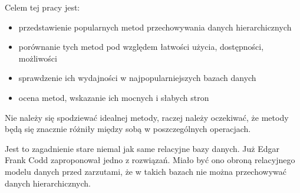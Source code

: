 






Celem tej pracy jest:
\begin{itemize}
    \item przedstawienie popularnych metod przechowywania danych hierarchicznych
    \item porównanie tych metod pod względem łatwości użycia, dostępności, możliwości
    \item sprawdzenie ich wydajności w najpopularniejszych bazach danych
    \item ocena metod, wskazanie ich mocnych i słabych stron
\end{itemize}

Nie należy się spodziewać idealnej metody, raczej należy oczekiwać, że metody będą się znacznie różniły między sobą w poszczególnych operacjach.


Jest to zagadnienie stare niemal jak same relacyjne bazy danych. 
Już Edgar Frank Codd zaproponował jedno z rozwiązań.
Miało być ono obroną relacyjnego modelu danych przed zarzutami, 
że w takich bazach nie można przechowywać danych hierarchicznych.



